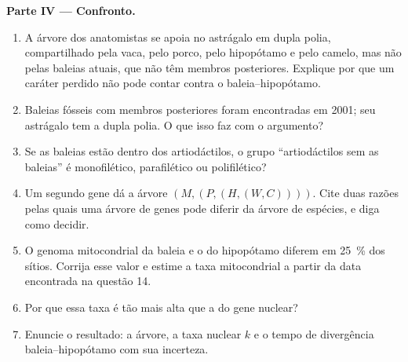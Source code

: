 \begin{problem}
\medskip
\noindent\textbf{Parte IV --- Confronto.}
\begin{enumerate}[resume]
  \item A árvore dos anatomistas se apoia no astrágalo em dupla polia,
        compartilhado pela vaca, pelo porco, pelo hipopótamo e pelo
        camelo, mas não pelas baleias atuais, que não têm membros
        posteriores. Explique por que um caráter perdido não pode contar
        contra o  baleia--hipopótamo.
  \item Baleias fósseis com membros posteriores foram encontradas em
        2001; seu astrágalo tem a dupla polia. O que isso faz com o
        argumento?
  \item Se as baleias estão dentro dos artiodáctilos, o grupo
        ``artiodáctilos sem as baleias'' é monofilético,
        parafilético ou polifilético?
  \item Um segundo gene dá a árvore $(M,(P,(H,(W,C))))$. Cite duas
        razões pelas quais uma árvore de genes pode diferir da árvore de
        espécies, e diga como decidir.
  \item O genoma mitocondrial da baleia e o do hipopótamo diferem em
        \qty{25}{\%} dos sítios. Corrija esse valor e estime a taxa
        mitocondrial a partir da data encontrada na questão 14.
  \item Por que essa taxa é tão mais alta que a do gene nuclear?
  \item Enuncie o resultado: a árvore, a taxa nuclear $k$ e o tempo de
        divergência baleia--hipopótamo com sua incerteza.
\end{enumerate}
\end{problem}
